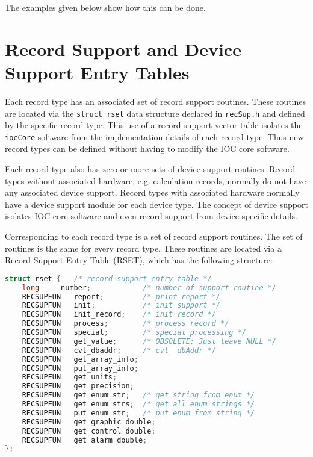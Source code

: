 The examples given below show how this can be done.

\section{Record Support and Device Support Entry Tables}

Each record type has an associated set of record support routines.
These routines are located via the \verb|struct rset| data structure declared in \verb|recSup.h| and defined by the specific record type.
This use of a record support vector table isolates the \verb|iocCore| software from the implementation details of each record type.
Thus new record types can be defined without having to modify the IOC core software.

Each record type also has zero or more sets of device support routines.
Record types without associated hardware, e.g. calculation records, normally do not have any associated device support.
Record types with associated hardware normally have a  device support module for each device type.
The concept of device support isolates IOC core software and even record support from device specific details.

Corresponding to each record type is a set of record support routines.
The set of routines is the same for every record type.
These routines are located via a Record Support Entry Table (RSET), which has the following structure:

\begin{lstlisting}[language=C]
struct rset {   /* record support entry table */
    long     number;            /* number of support routine */
    RECSUPFUN   report;         /* print report */
    RECSUPFUN   init;           /* init support */
    RECSUPFUN   init_record;    /* init record */
    RECSUPFUN   process;        /* process record */
    RECSUPFUN   special;        /* special processing */
    RECSUPFUN   get_value;      /* OBSOLETE: Just leave NULL */
    RECSUPFUN   cvt_dbaddr;     /* cvt  dbAddr */
    RECSUPFUN   get_array_info;
    RECSUPFUN   put_array_info;
    RECSUPFUN   get_units;
    RECSUPFUN   get_precision;
    RECSUPFUN   get_enum_str;   /* get string from enum */
    RECSUPFUN   get_enum_strs;  /* get all enum strings */
    RECSUPFUN   put_enum_str;   /* put enum from string */
    RECSUPFUN   get_graphic_double;
    RECSUPFUN   get_control_double;
    RECSUPFUN   get_alarm_double;
};
\end{lstlisting}

